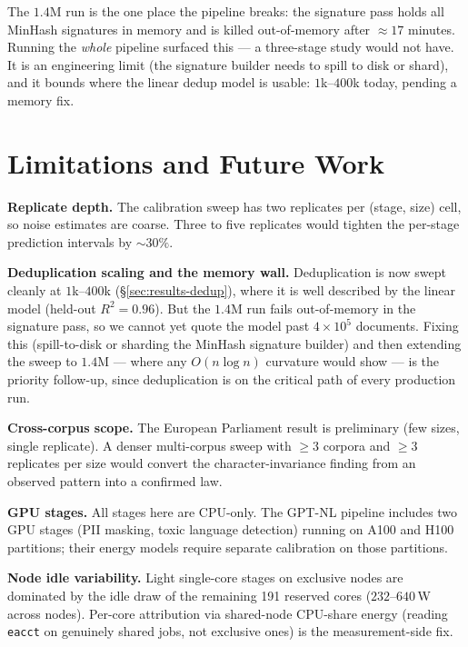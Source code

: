 \documentclass{article}
\begin{document}
The $1.4$M run is the one place the pipeline breaks: the signature pass holds all MinHash signatures in memory and is killed out-of-memory after ${\approx}17$ minutes. Running the \emph{whole} pipeline surfaced this --- a three-stage study would not have. It is an engineering limit (the signature builder needs to spill to disk or shard), and it bounds where the linear dedup model is usable: $1$k--$400$k today, pending a memory fix.

\section{Limitations and Future Work}

\label{sec:limitations}

\textbf{Replicate depth.} The calibration sweep has two replicates per (stage, size) cell, so noise estimates are coarse. Three to five replicates would tighten the per-stage prediction intervals by ${\sim}30\%$.

\textbf{Deduplication scaling and the memory wall.} Deduplication is now swept cleanly at $1$k--$400$k (\S\ref{sec:results-dedup}), where it is well described by the linear model (held-out $R^2=0.96$). But the $1.4$M run fails out-of-memory in the signature pass, so we cannot yet quote the model past $4{\times}10^5$ documents. Fixing this (spill-to-disk or sharding the MinHash signature builder) and then extending the sweep to $1.4$M --- where any $O(n\log n)$ curvature would show --- is the priority follow-up, since deduplication is on the critical path of every production run.

\textbf{Cross-corpus scope.} The European Parliament result is preliminary (few sizes, single replicate). A denser multi-corpus sweep with ${\ge}3$ corpora and ${\ge}3$ replicates per size would convert the character-invariance finding from an observed pattern into a confirmed law.

\textbf{GPU stages.} All stages here are CPU-only. The GPT-NL pipeline includes two GPU stages (PII masking, toxic language detection) running on A100 and H100 partitions; their energy models require separate calibration on those partitions.

\textbf{Node idle variability.} Light single-core stages on exclusive nodes are dominated by the idle draw of the remaining 191 reserved cores ($232$--$640$\,W across nodes). Per-core attribution via shared-node CPU-share energy (reading \texttt{eacct} on genuinely shared jobs, not exclusive ones) is the measurement-side fix.
\end{document}
